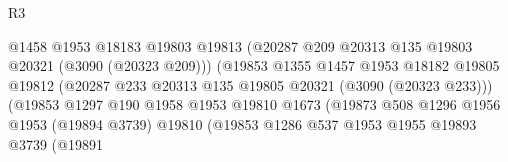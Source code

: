 \begin{lexlean}{R3}
\begin{coremodule}
                                            @1458
                                            @1953
                                            @18183
                                            @19803
                                            @19813
                                            (@20287
                                              @209
                                              @20313
                                              @135
                                              @19803
                                              @20321
                                              (@3090 (@20323 @209)))
                                            (@19853
                                              @1355
                                              @1457
                                              @1953
                                              @18182
                                              @19805
                                              @19812
                                              (@20287
                                                @233
                                                @20313
                                                @135
                                                @19805
                                                @20321
                                                (@3090 (@20323 @233)))
                                              (@19853
                                                @1297
                                                @190
                                                @1958
                                                @1953
                                                @19810
                                                @1673
                                                (@19873
                                                  @508
                                                  @1296
                                                  @1956
                                                  @1953
                                                  (@19894 @3739)
                                                  @19810
                                                  (@19853
                                                    @1286
                                                    @537
                                                    @1953
                                                    @1955
                                                    @19893
                                                    @3739
                                                    (@19891

\end{coremodule}
\end{lexlean}
